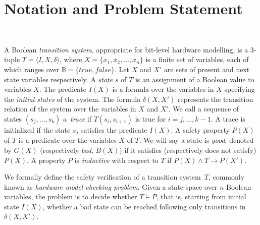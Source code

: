 \section{Notation and Problem Statement}~\label{sec:notation}

A Boolean \textit{transition system}, appropriate for bit-level hardware
modelling, is a 3-tuple $T = \langle I,X,\delta \rangle$, where $X = \{x_1,x_2,\dots ,x_n\}$
is a finite set of variables, each of which ranges over $\mathbb{B} = 
\{\mathit{true}, \mathit{false}\}$.  
%
Let $X$ and $X'$ are sets of present and next state variables respectively.  
% 
A \emph{state} $s$ of $T$ is an assignment of a Boolean value to variables $X$.  
The predicate $I(X)$ is a formula over
the variables in $X$ specifying the \emph{initial states} of the system.
The formula $\delta(X,X')$ represents the transition relation of the system 
over the variables in $X$ and $X'$. 
% 
We call a sequence of states $(s_j,\dots,s_k)$ a~\emph{trace} 
if $T(s_i,s_{i+1})$ is true for $i=j,\dots,k-1$.  A trace is 
initialized if the state $s_j$ satisfies the predicate $I(X)$.  
%  
A safety property $P(X)$ of $T$ is a predicate over the
variables $X$ of $T$.  We will say a state is \emph{good}, 
denoted by $G(X)$ (respectively \emph{bad}, $B(X)$) if it 
satisfies (respectively does not satisfy) $P(X)$.  A property 
$P$ is \emph{inductive} with respect to $T$ if 
$P(X) \wedge T \rightarrow P(X')$.    
%

We formally define the safety verification of a transition system~$T$,
commonly known as \emph{hardware model checking problem}.  
Given a state-space over $n$ Boolean variables, the problem is to
decide whether $T \models P$, that is, starting from initial state
$I(X)$, whether a bad state can be reached following only transitions 
in $\delta(X,X')$.
%
